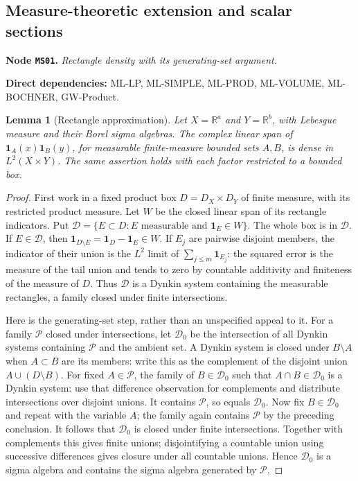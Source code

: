 \documentclass[11pt,a4paper]{article}
\newtheorem{lemma}[theorem]{Lemma}
\theoremstyle{remark}\newtheorem{remark}[theorem]{Remark}
\newcommand{\R}{\mathbb R}\newcommand{\C}{\mathbb C}\newcommand{\N}{\mathbb N}
\newcommand{\node}[3]{\par\Needspace{6\baselineskip}\smallskip\hypertarget{node:#1}{}\label{nodepage:#1}\noindent\textbf{Node \texttt{#1}.} \textit{#2.}\par\noindent\textbf{Direct dependencies:} #3.\par}
\begin{document}
\subsection{Measure-theoretic extension and scalar sections}
\node{MS01}{Rectangle density with its generating-set argument}{ML-LP, ML-SIMPLE, ML-PROD, ML-VOLUME, ML-BOCHNER, GW-Product}
\begin{lemma}[Rectangle approximation]\label{lem:rectdense}
Let $X=\R^a$ and $Y=\R^b$, with Lebesgue measure and their Borel sigma algebras. The complex linear span of
$\mathbf1_A(x)\mathbf1_B(y)$, for measurable finite-measure bounded sets $A,B$, is dense in $L^2(X\times Y)$. The same assertion holds with each factor restricted to a bounded box.
\end{lemma}
\begin{proof}
First work in a fixed product box $D=D_X\times D_Y$ of finite measure, with its restricted product measure. Let $W$ be the closed linear span of its rectangle indicators. Put
$\mathscr D=\{E\subset D:E\text{ measurable and }\mathbf1_E\in W\}$.
The whole box is in $\mathscr D$. If $E\in\mathscr D$, then $\mathbf1_{D\setminus E}=\mathbf1_D-\mathbf1_E\in W$. If $E_j$ are pairwise disjoint members, the indicator of their union is the $L^2$ limit of $\sum_{j\leq m}\mathbf1_{E_j}$: the squared error is the measure of the tail union and tends to zero by countable additivity and finiteness of the measure of $D$. Thus $\mathscr D$ is a Dynkin system containing the measurable rectangles, a family closed under finite intersections.

Here is the generating-set step, rather than an unspecified appeal to it. For a family $\mathscr P$ closed under intersections, let $\mathscr D_0$ be the intersection of all Dynkin systems containing $\mathscr P$ and the ambient set. A Dynkin system is closed under $B\setminus A$ when $A\subset B$ are its members: write this as the complement of the disjoint union $A\cup(D\setminus B)$. For fixed $A\in\mathscr P$, the family of $B\in\mathscr D_0$ such that $A\cap B\in\mathscr D_0$ is a Dynkin system: use that difference observation for complements and distribute intersections over disjoint unions. It contains $\mathscr P$, so equals $\mathscr D_0$. Now fix $B\in\mathscr D_0$ and repeat with the variable $A$; the family again contains $\mathscr P$ by the preceding conclusion. It follows that $\mathscr D_0$ is closed under finite intersections. Together with complements this gives finite unions; disjointifying a countable union using successive differences gives closure under all countable unions. Hence $\mathscr D_0$ is a sigma algebra and contains the sigma algebra generated by $\mathscr P$.


\end{proof}
\end{document}
